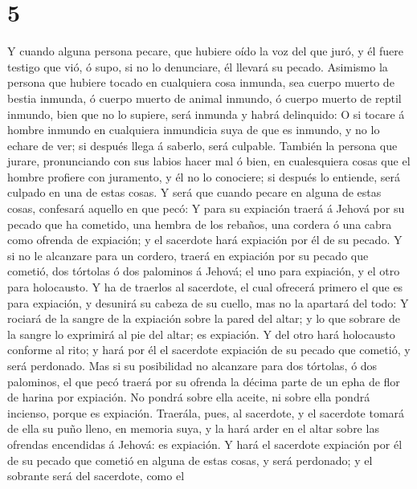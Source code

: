 \hypertarget{section-4}{%
\section{5}\label{section-4}}

 Y cuando alguna persona pecare, que hubiere oído la voz
del que juró, y él fuere testigo que vió, ó supo, si no lo denunciare,
él llevará su pecado.  Asimismo la persona que hubiere
tocado en cualquiera cosa inmunda, sea cuerpo muerto de bestia inmunda,
ó cuerpo muerto de animal inmundo, ó cuerpo muerto de reptil inmundo,
bien que no lo supiere, será inmunda y habrá delinquido: 
O si tocare á hombre inmundo en cualquiera inmundicia suya de que es
inmundo, y no lo echare de ver; si después llega á saberlo, será
culpable.  También la persona que jurare, pronunciando con
sus labios hacer mal ó bien, en cualesquiera cosas que el hombre
profiere con juramento, y él no lo conociere; si después lo entiende,
será culpado en una de estas cosas.  Y será que cuando
pecare en alguna de estas cosas, confesará aquello en que pecó:
 Y para su expiación traerá á Jehová por su pecado que ha
cometido, una hembra de los rebaños, una cordera ó una cabra como
ofrenda de expiación; y el sacerdote hará expiación por él de su pecado.
 Y si no le alcanzare para un cordero, traerá en expiación
por su pecado que cometió, dos tórtolas ó dos palominos á Jehová; el uno
para expiación, y el otro para holocausto.  Y ha de
traerlos al sacerdote, el cual ofrecerá primero el que es para
expiación, y desunirá su cabeza de su cuello, mas no la apartará del
todo:  Y rociará de la sangre de la expiación sobre la
pared del altar; y lo que sobrare de la sangre lo exprimirá al pie del
altar; es expiación.  Y del otro hará holocausto conforme
al rito; y hará por él el sacerdote expiación de su pecado que cometió,
y será perdonado.  Mas si su posibilidad no alcanzare
para dos tórtolas, ó dos palominos, el que pecó traerá por su ofrenda la
décima parte de un epha de flor de harina por expiación. No pondrá sobre
ella aceite, ni sobre ella pondrá incienso, porque es expiación.
 Traerála, pues, al sacerdote, y el sacerdote tomará de
ella su puño lleno, en memoria suya, y la hará arder en el altar sobre
las ofrendas encendidas á Jehová: es expiación.  Y hará
el sacerdote expiación por él de su pecado que cometió en alguna de
estas cosas, y será perdonado; y el sobrante será del sacerdote, como el

